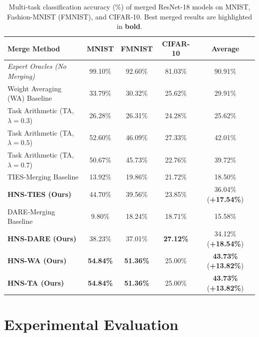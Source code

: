 \documentclass{article}
\theoremstyle{plain}
\theoremstyle{definition}
\theoremstyle{remark}
\begin{document}
\begin{table}[t]
  \caption{Multi-task classification accuracy (\%) of merged ResNet-18 models on MNIST, Fashion-MNIST (FMNIST), and CIFAR-10. Best merged results are highlighted in \textbf{bold}.}
  \label{tab:main_results}
  \centering
  \begin{tabular}{lcccc}
    \toprule
    \textbf{Merge Method} & \textbf{MNIST} & \textbf{FMNIST} & \textbf{CIFAR-10} & \textbf{Average} \\
    \midrule
    \textit{Expert Oracles (No Merging)} & 99.10\% & 92.60\% & 81.03\% & 90.91\% \\
    \midrule
    Weight Averaging (WA) Baseline & 33.79\% & 30.32\% & 25.62\% & 29.91\% \\
    Task Arithmetic (TA, $\lambda = 0.3$) & 26.28\% & 26.31\% & 24.28\% & 25.62\% \\
    Task Arithmetic (TA, $\lambda = 0.5$) & 52.60\% & 46.09\% & 27.33\% & 42.01\% \\
    Task Arithmetic (TA, $\lambda = 0.7$) & 50.67\% & 45.73\% & 22.76\% & 39.72\% \\
    \midrule
    TIES-Merging Baseline & 13.92\% & 19.86\% & 21.72\% & 18.50\% \\
    \textbf{HNS-TIES (Ours)} & 44.70\% & 39.56\% & 23.85\% & 36.04\% \quad (\textbf{+17.54\%}) \\
    \midrule
    DARE-Merging Baseline & 9.80\% & 18.24\% & 18.71\% & 15.58\% \\
    \textbf{HNS-DARE (Ours)} & 38.23\% & 37.01\% & \textbf{27.12\%} & 34.12\% \quad (\textbf{+18.54\%}) \\
    \midrule
    \textbf{HNS-WA (Ours)} & \textbf{54.84\%} & \textbf{51.36\%} & 25.00\% & \textbf{43.73\%} \quad (\textbf{+13.82\%}) \\
    \textbf{HNS-TA (Ours)} & \textbf{54.84\%} & \textbf{51.36\%} & 25.00\% & \textbf{43.73\%} \quad (\textbf{+13.82\%}) \\
    \bottomrule
  \end{tabular}
\end{table}

\section{Experimental Evaluation}
\label{sec:experiments}
\end{document}
